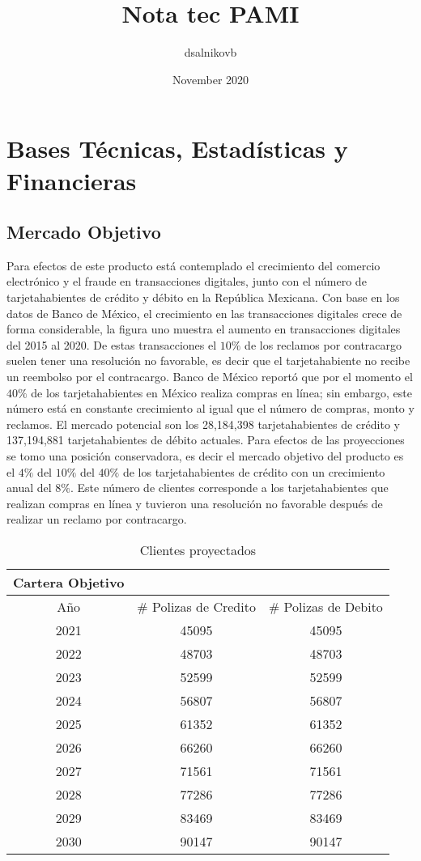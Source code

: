 \documentclass{article}
\title{Nota tec PAMI}
\author{dsalnikovb }
\date{November 2020}
\begin{document}
\section*{Bases Técnicas, Estadísticas y Financieras}
\subsection*{Mercado Objetivo}
Para efectos de este producto está contemplado el crecimiento del comercio electrónico y el fraude en transacciones digitales, junto con el número de tarjetahabientes de crédito y débito en la República Mexicana.
Con base en los datos de Banco de México, el crecimiento en las transacciones digitales crece de forma considerable, la figura uno muestra el aumento en transacciones digitales del 2015 al 2020. De estas transacciones el $10\%$ de los reclamos por contracargo suelen tener una resolución no favorable, es decir que el tarjetahabiente no recibe un reembolso por el contracargo. 
Banco de México reportó que por el momento el $40\%$ de los tarjetahabientes en México realiza compras en línea; sin embargo, este número está en constante crecimiento al igual que el número de compras, monto  y reclamos. 
El mercado potencial son los 28,184,398 tarjetahabientes de crédito y 137,194,881 tarjetahabientes de débito actuales. Para efectos de las proyecciones se tomo una posición conservadora, es decir el mercado objetivo del producto es el $4\%$ del $10\%$ del $40\%$ de los tarjetahabientes de crédito con un crecimiento anual del $8\%$. Este número de clientes corresponde a los tarjetahabientes que realizan compras en línea y tuvieron una resolución no favorable después de realizar un reclamo por contracargo.
\begin{table}[H]
    \centering
    \begin{tabular}{c|c|c}
     Cartera Objetivo &  &  \\
\hline
Año	& $\#$ Polizas de Credito &	$\#$ Polizas de Debito \\
\hline
2021  &	45095	& 45095 \\
2022	& 48703	& 48703 \\
2023	& 52599	& 52599 \\
2024	& 56807	& 56807 \\
2025	& 61352	& 61352 \\
2026	& 66260	& 66260 \\
2027	& 71561	& 71561 \\
2028	& 77286	& 77286 \\
2029	& 83469	& 83469 \\
2030	& 90147	& 90147 \\
    \end{tabular}
    \caption{Clientes proyectados}

\end{table}
\end{document}
